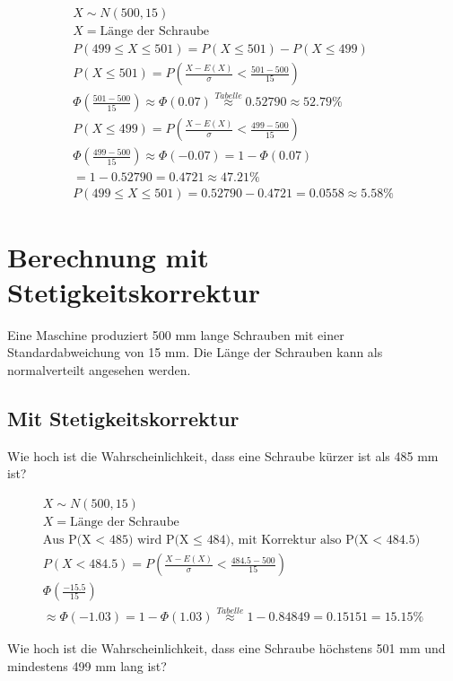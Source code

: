 \begin{align*}
    X \sim N(500, 15) \\
    X = \text{Länge der Schraube} \\
    P(499 \leq X \leq 501) = P(X \leq 501) - P(X \leq 499) \\
    P(X \leq 501) = P\left(\frac{X - E(X)}{\sigma} < \frac{501 - 500}{15}\right) \\
    \Phi(\frac{501 - 500}{15}) \approx \Phi(0.07) \overset{Tabelle}{\approx} 0.52790 \approx 52.79\% \\
    P(X \leq 499) = P\left(\frac{X - E(X)}{\sigma} < \frac{499 - 500}{15}\right) \\
    \Phi\left(\frac{499-500}{15}\right) \approx \Phi(-0.07) = 1 - \Phi(0.07)\\
    = 1 - 0.52790 = 0.4721 \approx 47.21\%\\
    P(499 \leq X \leq 501) = 0.52790 - 0.4721 = 0.0558 \approx 5.58\%
\end{align*}

\section*{Berechnung mit Stetigkeitskorrektur}

Eine Maschine produziert 500 mm lange Schrauben mit einer Standardabweichung von 15 mm. Die Länge der Schrauben kann als normalverteilt angesehen werden.

\subsection{Mit Stetigkeitskorrektur}

Wie hoch ist die Wahrscheinlichkeit, dass eine Schraube kürzer ist als 485 mm ist?

\begin{align*}
    X \sim N(500, 15) \\
    X = \text{Länge der Schraube} \\
    \text{Aus P(X < 485) wird P(X $\leq$ 484), mit Korrektur also P(X < 484.5)} \\
    P(X < 484.5) = P\left(\frac{X - E(X)}{\sigma} < \frac{484.5 - 500}{15}\right) \\
    \Phi\left(\frac{-15.5}{15}\right) \\
    \approx \Phi(-1.03) = 1 - \Phi(1.03) \overset{Tabelle}{\approx} 1 - 0.84849 = 0.15151 = 15.15\%
\end{align*}

Wie hoch ist die Wahrscheinlichkeit, dass eine Schraube höchstens 501 mm und mindestens 499 mm lang ist?

